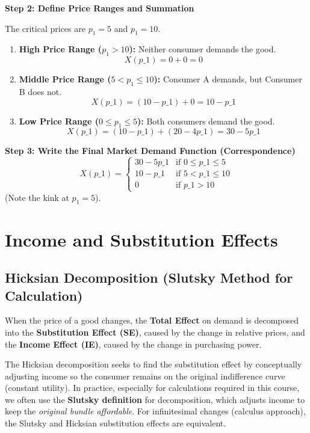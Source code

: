 \documentclass{article}
\begin{document}
\textbf{Step 2: Define Price Ranges and Summation} 

The critical prices are $p_1=5$ and $p_1=10$.
\begin{enumerate}
    \item \textbf{High Price Range ($p_1 > 10$):} Neither consumer demands the good. 
    \[ X(p\_1) = 0 + 0 = 0 \]
    \item \textbf{Middle Price Range ($5 < p_1 \leq 10$):} Consumer A demands, but Consumer B does not. 
    \[ X(p\_1) = (10 - p\_1) + 0 = 10 - p\_1 \]
    \item \textbf{Low Price Range ($0 \leq p_1 \leq 5$):} Both consumers demand the good. 
    \[ X(p\_1) = (10 - p\_1) + (20 - 4p\_1) = 30 - 5p\_1 \]
\end{enumerate}

\textbf{Step 3: Write the Final Market Demand Function (Correspondence)}
\[ X(p\_1) = \begin{cases} 30 - 5p\_1 & \text{if } 0 \leq p\_1 \leq 5 \\ 10 - p\_1 & \text{if } 5 < p\_1 \leq 10 \\ 0 & \text{if } p\_1 > 10 \end{cases} \]
(Note the kink at $p_1=5$).

\section*{Income and Substitution Effects}
\subsection*{Hicksian Decomposition (Slutsky Method for Calculation)}

When the price of a good changes, the \textbf{Total Effect} on demand is decomposed into the \textbf{Substitution Effect (SE)}, caused by the change in relative prices, and the \textbf{Income Effect (IE)}, caused by the change in purchasing power.

The Hicksian decomposition seeks to find the substitution effect by conceptually adjusting income so the consumer remains on the original indifference curve (constant utility). In practice, especially for calculations required in this course, we often use the \textbf{Slutsky definition} for decomposition, which adjusts income to keep the \textit{original bundle affordable}. For infinitesimal changes (calculus approach), the Slutsky and Hicksian substitution effects are equivalent.
\end{document}
